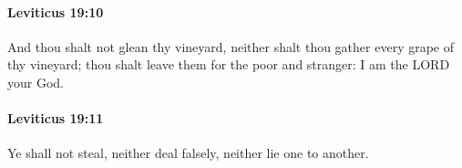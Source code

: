 		\paragraph{Leviticus 19:10} %
			\label{LEVITICUS-19-10}

			And thou shalt not glean thy vineyard, neither shalt thou gather every grape of thy vineyard; thou shalt leave them for the poor and stranger: I am the LORD your God.


		\paragraph{Leviticus 19:11} %
			\label{LEVITICUS-19-11}

			Ye shall not steal, neither deal falsely, neither lie one to another.


